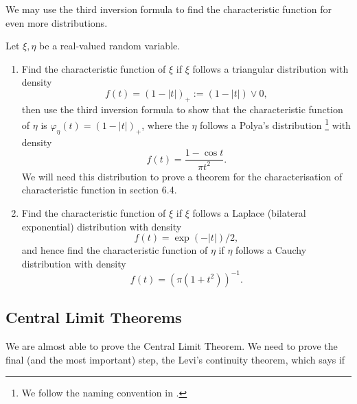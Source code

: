 We may use the third inversion formula to find the characteristic function for even more distributions.
\begin{exercise} \label{ex:CF_Polya_Cauchy}
Let $\xi,\eta$ be a real-valued random variable.
\begin{enumerate}
    \item Find the characteristic function of $\xi$ if $\xi$ follows a triangular distribution with density
    \begin{equation}
        f(t) = (1-|t|)_+ := (1-|t|) \vee 0,
    \end{equation}
    then use the third inversion formula to show that the characteristic function of $\eta$ is $\varphi_\eta(t) = (1-|t|)_+$, where the $\eta$ follows a Polya's distribution \footnote{We follow the naming convention in \cite{Durrett}.} with density
    \begin{equation}
        f(t) = \frac{1-\cos t}{\pi t^2}.
    \end{equation}
    We will need this distribution to prove a theorem for the characterisation of characteristic function in section 6.4.
    \item Find the characteristic function of $\xi$ if $\xi$ follows a Laplace (bilateral exponential) distribution with density
    \begin{equation}
        f(t) = \exp(-|t|)/2,
    \end{equation}
    and hence find the characteristic function of $\eta$ if $\eta$ follows a Cauchy distribution with density
    \begin{equation}
        f(t) = (\pi(1+t^2))^{-1}.
    \end{equation}
\end{enumerate}
\end{exercise}

\subsection{Central Limit Theorems}
We are almost able to prove the Central Limit Theorem. We need to prove the final (and the most important) step, the Levi's continuity theorem, which says if 

